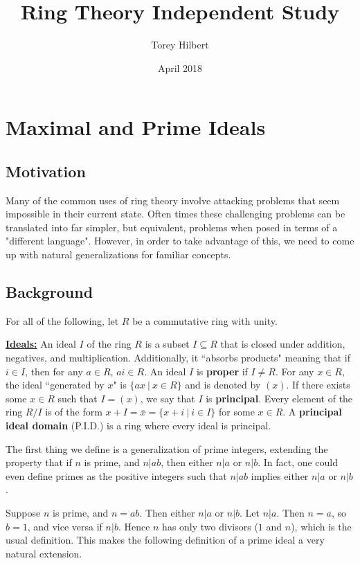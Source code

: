 \documentclass{article}
\title{Ring Theory Independent Study}
\author{Torey Hilbert}
\date{April 2018}
\begin{document}
\maketitle

\setlength\parindent{24pt}

\section{Maximal and Prime Ideals}

\subsection{Motivation}

  Many of the common uses of ring theory involve attacking problems that seem impossible in their current state. Often times these challenging problems can be translated into far simpler, but equivalent, problems when posed in terms of a "different language". However, in order to take advantage of this, we need to come up with natural generalizations for familiar concepts.

\subsection{Background}

For all of the following, let $R$ be a commutative ring with unity.

\noindent \textbf{\underline{Ideals:}} An ideal $I$ of the ring $R$ is a subset $I\subseteq R$ that is closed under addition, negatives, and multiplication. Additionally, it ``absorbs products" meaning that if $i\in I$, then for any $a\in R$, $ai\in R$. An ideal $I$ is \textbf{proper} if $I\neq R$. For any $x\in R$, the ideal ``generated by $x$" is $\{ax\ |\ x\in R\}$ and is denoted by $(x)$. If there exists some $x\in R$ such that $I=(x)$, we say that $I$ is \textbf{principal}. Every element of the ring $R/I$ is of the form $x+I=\bar{x}=\{x+i\ |\ i\in I\}$ for some $x\in R$. A \textbf{principal ideal domain} (P.I.D.) is a ring where every ideal is principal.

The first thing we define is a generalization of prime integers, extending the property that if $n$ is prime, and $n|ab$, then either $n|a$ or $n|b$. In fact, one could even define primes as the positive integers such that $n|ab$ implies either $n|a$ or $n|b$. 

Suppose $n$ is prime, and $n=ab$. Then either $n|a$ or $n|b$. Let $n|a$. Then $n=a$, so $b=1$, and vice versa if $n|b$. Hence $n$ has only two divisors ($1$ and $n$), which is the usual definition. This makes the following definition of a prime ideal a very natural extension.  
\end{document}
